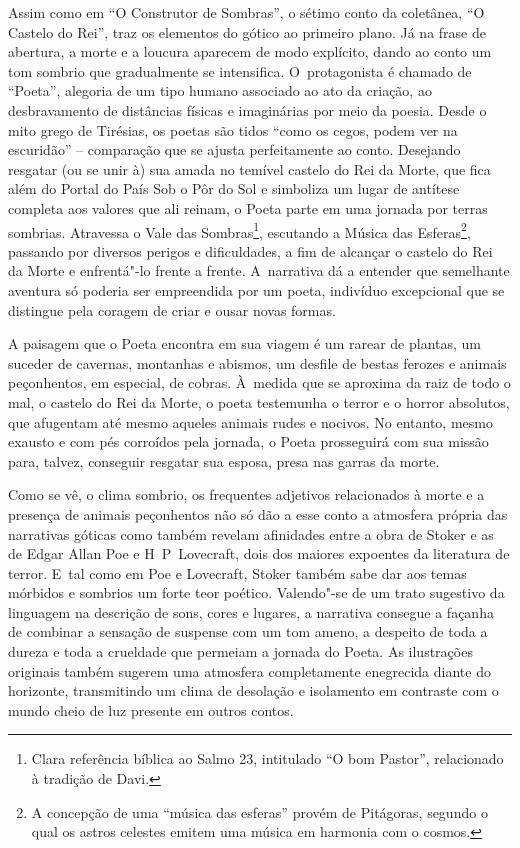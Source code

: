 Assim como em ``O Construtor de Sombras'', o sétimo conto da coletânea,
``O Castelo do Rei'', traz os elementos do gótico ao primeiro plano. Já
na frase de abertura, a morte e a loucura aparecem de modo explícito,
dando ao conto um tom sombrio que gradualmente se intensifica. O~protagonista é chamado de ``Poeta'', alegoria de um tipo humano
associado ao ato da criação, ao desbravamento de distâncias físicas e
imaginárias por meio da poesia. Desde o mito grego de Tirésias, os
poetas são tidos ``como os cegos, podem ver na escuridão'' -- comparação
que se ajusta perfeitamente ao conto. Desejando resgatar (ou se unir à)
sua amada no temível castelo do Rei da Morte, que fica além do Portal do
País Sob o Pôr do Sol e simboliza um lugar de antítese completa aos
valores que ali reinam, o Poeta parte em uma jornada por terras
sombrias. Atravessa o Vale das Sombras\footnote{Clara referência bíblica ao Salmo 23,
intitulado ``O bom Pastor'', relacionado à tradição de Davi.
},
escutando a Música das Esferas\footnote{A concepção de uma ``música das esferas''
provém de Pitágoras, segundo o qual os astros celestes emitem uma música
em harmonia com o cosmos.}, passando por
diversos perigos e dificuldades, a fim de alcançar o castelo do Rei da
Morte e enfrentá"-lo frente a frente. A~narrativa dá a entender que
semelhante aventura só poderia ser empreendida por um poeta, indivíduo
excepcional que se distingue pela coragem de criar e ousar novas formas.

A paisagem que o Poeta encontra em sua viagem é um rarear de plantas, um
suceder de cavernas, montanhas e abismos, um desfile de bestas ferozes e
animais peçonhentos, em especial, de cobras. À~medida que se aproxima da
raiz de todo o mal, o castelo do Rei da Morte, o poeta testemunha o
terror e o horror absolutos, que afugentam até mesmo aqueles animais
rudes e nocivos. No entanto, mesmo exausto e com pés corroídos pela
jornada, o Poeta prosseguirá com sua missão para, talvez, conseguir
resgatar sua esposa, presa nas garras da morte.

Como se vê, o clima sombrio, os frequentes adjetivos relacionados à
morte e a presença de animais peçonhentos não só dão a esse conto a
atmosfera própria das narrativas góticas como também revelam afinidades
entre a obra de Stoker e as de Edgar Allan Poe e H\, P\, Lovecraft, dois
dos maiores expoentes da literatura de terror. E~tal como em Poe e
Lovecraft, Stoker também sabe dar aos temas mórbidos e sombrios um forte
teor poético. Valendo"-se de um trato sugestivo da linguagem na descrição
de sons, cores e lugares, a narrativa consegue a façanha de combinar a
sensação de suspense com um tom ameno, a despeito de toda a dureza e
toda a crueldade que permeiam a jornada do Poeta. As ilustrações
originais também sugerem uma atmosfera completamente enegrecida diante
do horizonte, transmitindo um clima de desolação e isolamento em
contraste com o mundo cheio de luz presente em outros contos.

